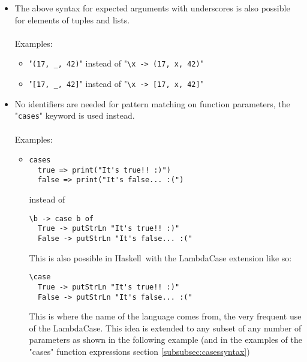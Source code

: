 \documentclass[diploma]{softlab-thesis}
\def\H{Haskell}
\begin{document}
\begin{itemize}
\begin{itemize}


\item
"\verb|"Hello " + _ + "! You look much younger than " + _ + "!"|"
\\ instead of \\
"\verb|\name age -> "Hello " ++ name ++ "! You look much younger than " + age + "!"|"

\item
"\verb|_^2 + _^2|" instead of "\verb|\x y -> x^2 + y^2|"

\item
etc

\end{itemize}

\item
The above syntax for expected arguments with underscores is also possible
for elements of tuples and lists.
\\\\
Examples:\\
\begin{itemize}

\item
"\verb|(17, _, 42)|" instead of "\verb|\x -> (17, x, 42)|"

\item
"\verb|[17, _, 42]|" instead of "\verb|\x -> [17, x, 42]|"

\end{itemize}

\newpage
\item
No identifiers are needed for pattern matching on function parameters,
the "\texttt{cases}" keyword is used instead.
\\\\
Examples:\\

\begin{itemize}

\item
\begin{verbatim}
cases
  true => print("It's true!! :)")
  false => print("It's false... :(")
\end{verbatim}
instead of
\begin{verbatim}
\b -> case b of
  True -> putStrLn "It's true!! :)"
  False -> putStrLn "It's false... :("
\end{verbatim}
This is also possible in \H\ with the LambdaCase extension like so:
\begin{verbatim}
\case
  True -> putStrLn "It's true!! :)"
  False -> putStrLn "It's false... :("
\end{verbatim}
This is where the name of the language comes from, the very frequent use
of the LambdaCase. This idea is extended to any subset of any number of
parameters as shown in the following example (and in the examples of
the "cases" function expressions section \ref{subsubsec:casessyntax})


\end{itemize}
\end{itemize}
\end{document}
